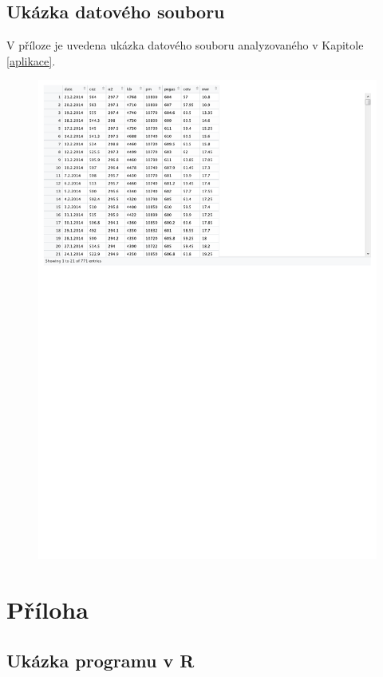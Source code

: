 \documentclass[a4paper,12pt]{report}
\theoremstyle{definition} \newtheorem{definice}[veta]{Definice}
\theoremstyle{remark}
\begin{document}
\section*{Ukázka datového souboru}
V příloze je uvedena ukázka datového souboru analyzovaného v Kapitole \ref{aplikace}.
\begin{figure}[!htbp]
  \centering 
\includegraphics[width=12.5cm, clip, trim= 0 510 277 10]{IMG/data_v2.pdf}
\end{figure}

\chapter[Příloha -- Ukázka programů]{Příloha}\label{priloha_programy}
\section*{Ukázka programu v R}
\end{document}
